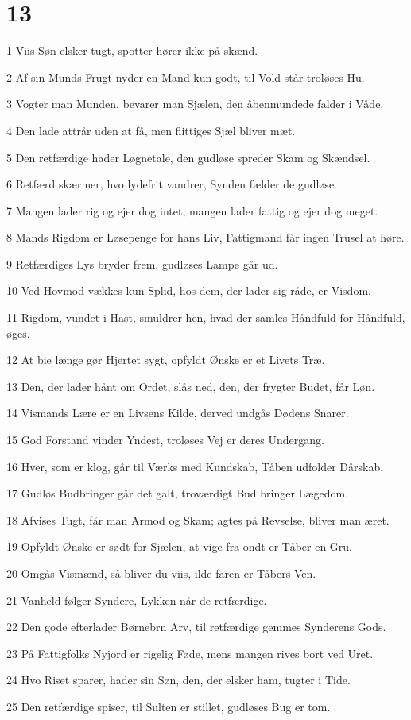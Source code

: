 \chapter{13}

\par 1 Viis Søn elsker tugt, spotter hører ikke på skænd.
\par 2 Af sin Munds Frugt nyder en Mand kun godt, til Vold står troløses Hu.
\par 3 Vogter man Munden, bevarer man Sjælen, den åbenmundede falder i Våde.
\par 4 Den lade attrår uden at få, men flittiges Sjæl bliver mæt.
\par 5 Den retfærdige hader Løgnetale, den gudløse spreder Skam og Skændsel.
\par 6 Retfærd skærmer, hvo lydefrit vandrer, Synden fælder de gudløse.
\par 7 Mangen lader rig og ejer dog intet, mangen lader fattig og ejer dog meget.
\par 8 Mands Rigdom er Løsepenge for hans Liv, Fattigmand får ingen Trusel at høre.
\par 9 Retfærdiges Lys bryder frem, gudløses Lampe går ud.
\par 10 Ved Hovmod vækkes kun Splid, hos dem, der lader sig råde, er Visdom.
\par 11 Rigdom, vundet i Hast, smuldrer hen, hvad der samles Håndfuld for Håndfuld, øges.
\par 12 At bie længe gør Hjertet sygt, opfyldt Ønske er et Livets Træ.
\par 13 Den, der lader hånt om Ordet, slås ned, den, der frygter Budet, får Løn.
\par 14 Vismands Lære er en Livsens Kilde, derved undgås Dødens Snarer.
\par 15 God Forstand vinder Yndest, troløses Vej er deres Undergang.
\par 16 Hver, som er klog, går til Værks med Kundskab, Tåben udfolder Dårskab.
\par 17 Gudløs Budbringer går det galt, troværdigt Bud bringer Lægedom.
\par 18 Afvises Tugt, får man Armod og Skam; agtes på Revselse, bliver man æret.
\par 19 Opfyldt Ønske er sødt for Sjælen, at vige fra ondt er Tåber en Gru.
\par 20 Omgås Vismænd, så bliver du viis, ilde faren er Tåbers Ven.
\par 21 Vanheld følger Syndere, Lykken når de retfærdige.
\par 22 Den gode efterlader Børnebrn Arv, til retfærdige gemmes Synderens Gods.
\par 23 På Fattigfolks Nyjord er rigelig Føde, mens mangen rives bort ved Uret.
\par 24 Hvo Riset sparer, hader sin Søn, den, der elsker ham, tugter i Tide.
\par 25 Den retfærdige spiser, til Sulten er stillet, gudløses Bug er tom.

